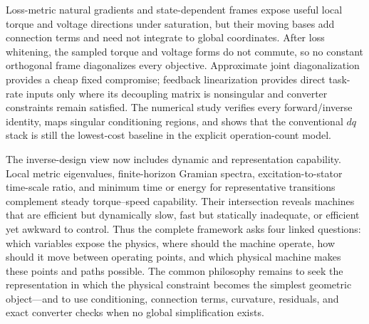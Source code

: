 Loss-metric natural gradients and state-dependent frames expose useful local
torque and voltage directions under saturation, but their moving bases add
connection terms and need not integrate to global coordinates. After loss
whitening, the sampled torque and voltage forms do not commute, so no constant
orthogonal frame diagonalizes every objective. Approximate joint
diagonalization provides a cheap fixed compromise; feedback linearization
provides direct task-rate inputs only where its decoupling matrix is
nonsingular and converter constraints remain satisfied. The numerical study
verifies every forward/inverse identity, maps singular conditioning regions,
and shows that the conventional \(dq\) stack is still the lowest-cost baseline
in the explicit operation-count model.

The inverse-design view now includes dynamic and representation capability. Local metric
eigenvalues, finite-horizon Gramian spectra, excitation-to-stator time-scale
ratio, and minimum time or energy for representative transitions complement
steady torque--speed capability. Their intersection reveals machines that are
efficient but dynamically slow, fast but statically inadequate, or efficient
yet awkward to control. Thus the complete framework asks four linked
questions: which variables expose the physics, where should the machine
operate, how should it move between operating points, and which physical
machine makes these points and paths possible. The common philosophy remains
to seek the representation in which the physical constraint becomes the
simplest geometric object---and to use conditioning, connection terms,
curvature, residuals, and exact converter checks when no global simplification
exists.
